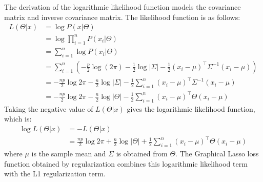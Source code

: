 The derivation of the logarithmic likelihood function models the covariance matrix and inverse covariance matrix. The likelihood function is as follows: $$
	\begin{aligned}
		L(\Theta|x) & =\log P(x|\Theta)                                                                                                                        \\
		            & =\log \prod_{i=1}^{n} P(x_i|\Theta)                                                                                                      \\
		            & =\sum_{i=1}^{n} \log P(x_i|\Theta)                                                                                                       \\
		            & =\sum_{i=1}^{n} \left( -\frac{p}{2} \log(2 \pi ) - \frac{1}{2} \log |\Sigma| -\frac{1}{2} (x_i-\mu)^{\top} \Sigma^{-1} (x_i-\mu) \right) \\
		            & =-\frac{np}{2} \log2\pi -\frac{n}{2} \log |\Sigma| -\frac{1}{2} \sum_{i=1}^{n} (x_i-\mu)^{\top} \Sigma^{-1} (x_i-\mu)                    \\
		            & =-\frac{np}{2} \log2\pi -\frac{n}{2} \log |\Theta| -\frac{1}{2} \sum_{i=1}^{n} (x_i-\mu)^{\top} \Theta (x_i-\mu)
	\end{aligned}
$$ Taking the negative value of $L(\Theta|x)$ gives the logarithmic likelihood function, which is: $$
	\begin{aligned}
		\log L(\Theta|x) & =-L(\Theta|x)                                                                                                   \\
		                 & =\frac{np}{2} \log2\pi +\frac{n}{2} \log |\Theta| +\frac{1}{2} \sum_{i=1}^{n} (x_i-\mu)^{\top} \Theta (x_i-\mu)
	\end{aligned}
$$ where $\mu$ is the sample mean and $\Sigma$ is obtained from $\Theta$. The Graphical Lasso loss function obtained by regularization combines this logarithmic likelihood term with the L1 regularization term.
